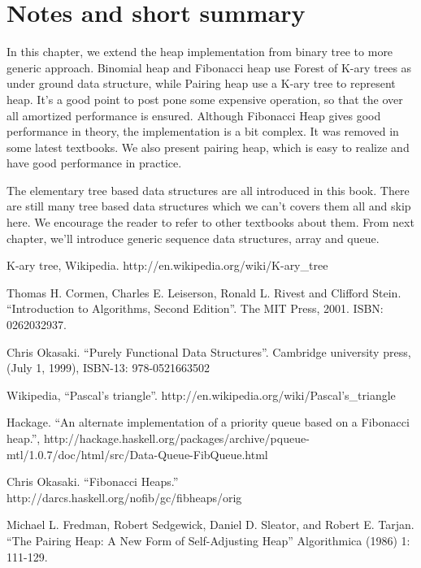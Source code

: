 \documentclass[UTF8]{article}
\begin{document}
\section{Notes and short summary}

In this chapter, we extend the heap implementation from binary tree to
more generic approach. Binomial heap and Fibonacci heap use Forest of
K-ary trees as under ground data structure, while Pairing heap use
a K-ary tree to represent heap. It's a good point to post pone some
expensive operation, so that the over all amortized performance is
ensured. Although Fibonacci Heap gives good performance in theory, the
implementation is a bit complex. It was removed in some latest textbooks.
We also present pairing heap, which is easy to realize and have good
performance in practice.

The elementary tree based data structures are all introduced in this
book. There are still many tree based data structures which we can't
covers them all and skip here. We encourage the reader to refer to
other textbooks about them. From next chapter, we'll introduce generic
sequence data structures, array and queue.


\begin{thebibliography}{99}

K-ary tree, Wikipedia. http://en.wikipedia.org/wiki/K-ary\_tree

Thomas H. Cormen, Charles E. Leiserson, Ronald L. Rivest and Clifford Stein. ``Introduction to Algorithms, Second Edition''. The MIT Press, 2001. ISBN: 0262032937.

Chris Okasaki. ``Purely Functional Data Structures''. Cambridge university press, (July 1, 1999), ISBN-13: 978-0521663502

Wikipedia, ``Pascal's triangle''. http://en.wikipedia.org/wiki/Pascal's\_triangle

Hackage. ``An alternate implementation of a priority queue based on a Fibonacci heap.'', http://hackage.haskell.org/packages/archive/pqueue-mtl/1.0.7/doc/html/src/Data-Queue-FibQueue.html

Chris Okasaki. ``Fibonacci Heaps.'' http://darcs.haskell.org/nofib/gc/fibheaps/orig

Michael L. Fredman, Robert Sedgewick, Daniel D. Sleator, and Robert E. Tarjan. ``The Pairing Heap: A New Form of Self-Adjusting Heap'' Algorithmica (1986) 1: 111-129.

\end{thebibliography}

\ifx\wholebook\relax \else
\end{document}
